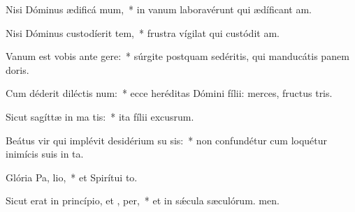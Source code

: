 \item Nisi Dóminus ædificá mum,~* in vanum laboravérunt qui ædíficant am.
\item Nisi Dóminus custodíerit tem,~* frustra vígilat qui custódit am.
\item Vanum est vobis ante  gere:~* súrgite postquam sedéritis, qui manducátis panem doris.
\item Cum déderit diléctis  num:~* ecce heréditas Dómini fílii: merces, fructus tris.
\item Sicut sagíttæ in ma tis:~* ita fílii excusrum.
\item Beátus vir qui implévit desidérium su  sis:~* non confundétur cum loquétur inimícis suis in ta.
\item Glória Pa,  lio,~* et Spirítui to.
\item Sicut erat in princípio, et ,  per,~* et in sǽcula sæculórum. men.
